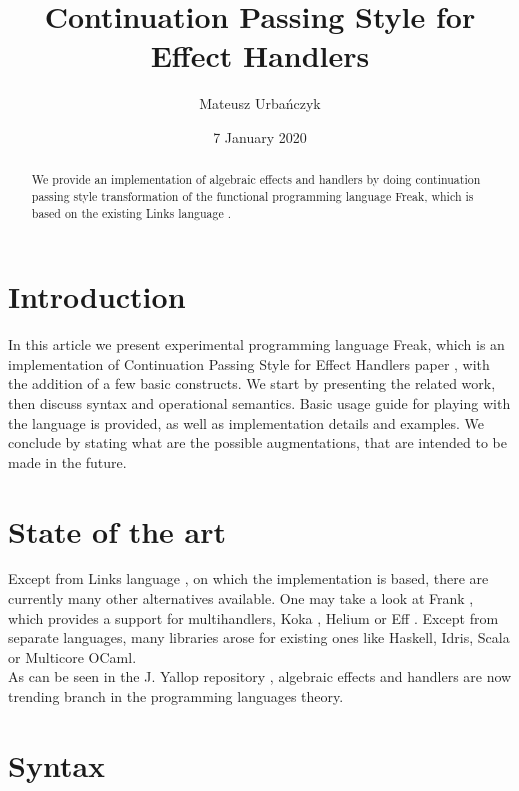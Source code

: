 \documentclass{article}
\title{Continuation Passing Style for Effect Handlers}
\author{Mateusz Urbańczyk}
\date{7 January 2020}
\theoremstyle{definition}
\theoremstyle{lemma}
\theoremstyle{observation}
\theoremstyle{theorem}
\begin{document}
\maketitle

\begin{abstract}

    We provide an implementation of algebraic effects and handlers by doing continuation
    passing style transformation of the functional programming language Freak,
    which is based on the existing Links language \cite{handlers-cps}.

\end{abstract}

\section{Introduction}

In this article we present experimental programming language Freak, which is an
implementation of Continuation Passing Style for Effect Handlers paper \cite{handlers-cps},
with the addition of a few basic constructs. We start by presenting the related work,
then discuss syntax and operational semantics. Basic usage guide for playing with
the language is provided, as well as implementation details and examples. We conclude
by stating what are the possible augmentations, that are intended to be made in the future.

\section{State of the art}

    Except from Links language \cite{handlers-cps}, on which the implementation
    is based, there are currently many other alternatives available. One may take
    a look at Frank \cite{frank}, which provides a support for multihandlers,
    Koka \cite{leijen-koka}, Helium \cite{helium} or Eff \cite{eff}. Except from
    separate languages, many libraries arose for existing ones like Haskell,
    Idris, Scala or Multicore OCaml. \\

    As can be seen in the J. Yallop repository \cite{effects-bibliography},
    algebraic effects and handlers are now trending branch in the programming languages theory.

\section{Syntax}
\end{document}
